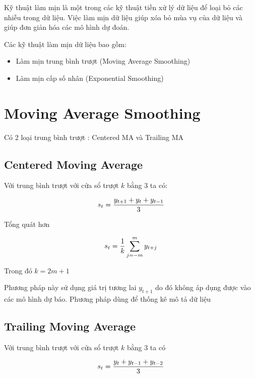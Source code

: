\documentclass[
]{book}
\providecommand{\tightlist}{%
  \setlength{\itemsep}{0pt}\setlength{\parskip}{0pt}}
\begin{document}
Kỹ thuật làm mịn là một trong các kỹ thuật tiền xử lý dữ liệu để loại bỏ các nhiễu trong dữ liệu. Việc làm mịn dữ liệu giúp xóa bỏ mùa vụ của dữ liệu và giúp đơn giản hóa các mô hình dự đoán.

Các kỹ thuật làm mịn dữ liệu bao gồm:

\begin{itemize}
\tightlist
\item
  Làm mịn trung bình trượt (Moving Average Smoothing)
\item
  Làm mịn cấp số nhân (Exponential Smoothing)
\end{itemize}

\section{Moving Average Smoothing}\label{moving-average-smoothing}

Có 2 loại trung bình trượt : Centered MA và Trailing MA

\subsection{Centered Moving Average}\label{centered-moving-average}

Với trung bình trượt với cửa sổ trượt \(k\) bằng 3 ta có:

\[\begin{align}
\Large s_{t} = \frac{y_{t+1} + y_{t} + y_{t-1}}{3}
\end{align}\]

Tổng quát hơn

\[\begin{align}
\Large s_{t} = \frac{1}{k}  \sum_{j=-m}^{m}{y_{t+j}}
\end{align}\]

Trong đó \(k = 2m + 1\)

Phương pháp này sử dụng giá trị tương lai \(y_{t+1}\) do đó không áp dụng được vào các mô hình dự báo. Phương pháp dùng để thống kê mô tả dữ liệu

\subsection{Trailing Moving Average}\label{trailing-moving-average}

Với trung bình trượt với cửa sổ trượt \(k\) bằng 3 ta có

\[\begin{align}
\Large s_{t} = \frac{y_{t} + y_{t - 1} + y_{t - 2}}{3}
\end{align}\]
\end{document}
